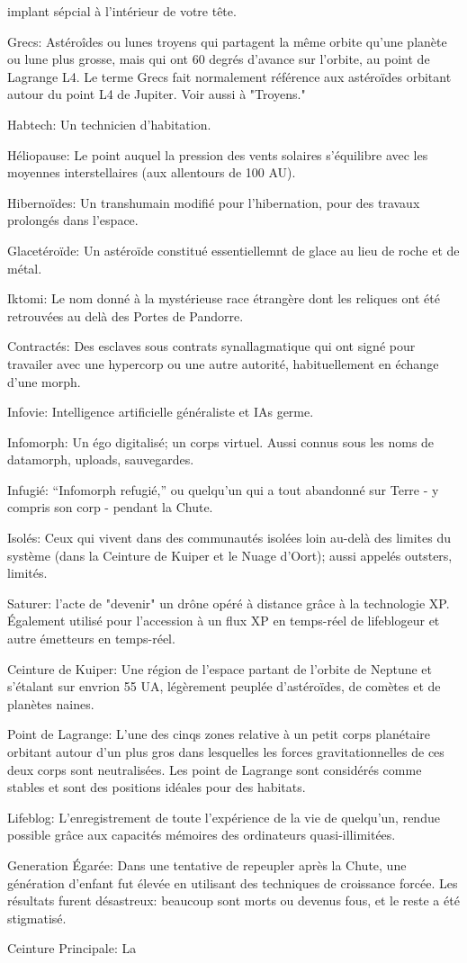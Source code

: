 implant sépcial à l'intérieur de votre tête. \item Grecs: Astéroîdes ou lunes troyens qui partagent la même orbite qu'une planète ou lune plus grosse, mais qui ont 60 degrés d'avance sur l'orbite, au point de Lagrange L4. Le terme Grecs fait normalement référence aux astéroïdes orbitant autour du point L4 de Jupiter. Voir aussi à "Troyens." \item Habtech: Un technicien d'habitation. \item Héliopause: Le point auquel la pression des vents solaires s'équilibre avec les moyennes interstellaires (aux allentours de 100 AU). \item Hibernoïdes: Un transhumain modifié pour l'hibernation, pour des travaux prolongés dans l'espace. \item Glacetéroïde: Un astéroïde constitué essentiellemnt de glace au lieu de roche et de métal. \item Iktomi: Le nom donné à la mystérieuse race étrangère dont les reliques ont été retrouvées au delà des Portes de Pandorre. \item Contractés: Des esclaves sous contrats synallagmatique qui ont signé pour travailer avec une hypercorp ou une autre autorité, habituellement en échange d'une morph. \item Infovie: Intelligence artificielle généraliste et IAs germe. \item Infomorph: Un égo digitalisé; un corps virtuel. Aussi connus sous les noms de datamorph, uploads, sauvegardes. \item Infugié: ``Infomorph refugié,'' ou quelqu'un qui a tout abandonné sur Terre - y compris son corp - pendant la Chute. \item Isolés: Ceux qui vivent dans des communautés isolées loin au-delà des limites du système (dans la Ceinture de Kuiper et le Nuage d'Oort); aussi appelés outsters, limités. \item Saturer: l'acte de "devenir" un drône opéré à distance grâce à la technologie XP. Également utilisé pour l'accession à un flux XP en temps-réel de lifeblogeur et autre émetteurs en temps-réel. \item Ceinture de Kuiper: Une région de l'espace partant de l'orbite de Neptune et s'étalant sur envrion 55 UA, légèrement peuplée d'astéroïdes, de comètes et de planètes naines. \item Point de Lagrange: L'une des cinqs zones relative à un petit corps planétaire orbitant autour d'un plus gros dans lesquelles les forces gravitationnelles de ces deux corps sont neutralisées. Les point de Lagrange sont considérés comme stables et sont des positions idéales pour des habitats. \item Lifeblog: L'enregistrement de toute l'expérience de la vie de quelqu'un, rendue possible grâce aux capacités mémoires des ordinateurs quasi-illimitées. \item Generation Égarée: Dans une tentative de repeupler après la Chute, une génération d'enfant fut élevée en utilisant des techniques de croissance forcée. Les résultats furent désastreux: beaucoup sont morts ou devenus fous, et le reste a été stigmatisé. \item Ceinture Principale: La 